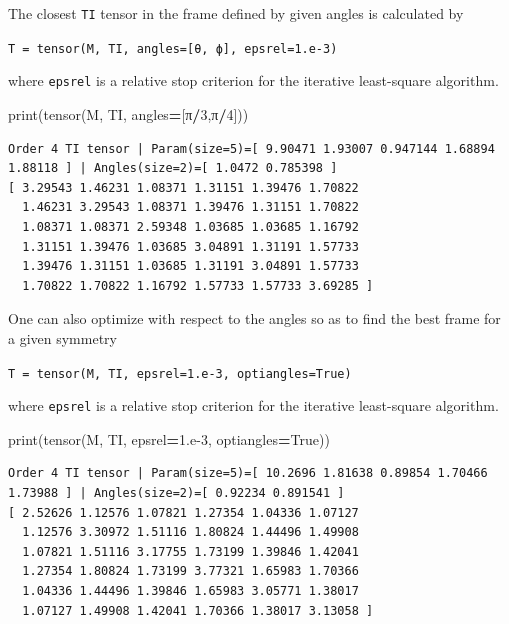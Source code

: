 \documentclass[
  a4paper,
  numbers=noendperiod,
  DIV=12]{scrreprt}
\newenvironment{Shaded}{\begin{snugshade}}{\end{snugshade}}
\newcommand{\BuiltInTok}[1]{#1}
\newcommand{\DecValTok}[1]{\textcolor[rgb]{0.00,0.00,0.81}{#1}}
\newcommand{\FloatTok}[1]{\textcolor[rgb]{0.00,0.00,0.81}{#1}}
\newcommand{\NormalTok}[1]{#1}
\newcommand{\OperatorTok}[1]{\textcolor[rgb]{0.81,0.36,0.00}{\textbf{#1}}}
\newcommand{\VariableTok}[1]{\textcolor[rgb]{0.00,0.00,0.00}{#1}}
\begin{document}
The closest \texttt{TI} tensor in the frame defined by given angles is
calculated by

\texttt{T\ =\ tensor(M,\ TI,\ angles={[}θ,\ ϕ{]},\ epsrel=1.e-3)}

where \texttt{epsrel} is a relative stop criterion for the iterative
least-square algorithm.

\begin{Shaded}
\begin{Highlighting}[]
\BuiltInTok{print}\NormalTok{(tensor(M, TI, angles}\OperatorTok{=}\NormalTok{[π}\OperatorTok{/}\DecValTok{3}\NormalTok{,π}\OperatorTok{/}\DecValTok{4}\NormalTok{]))}
\end{Highlighting}
\end{Shaded}

\begin{verbatim}
Order 4 TI tensor | Param(size=5)=[ 9.90471 1.93007 0.947144 1.68894 1.88118 ] | Angles(size=2)=[ 1.0472 0.785398 ]
[ 3.29543 1.46231 1.08371 1.31151 1.39476 1.70822 
  1.46231 3.29543 1.08371 1.39476 1.31151 1.70822 
  1.08371 1.08371 2.59348 1.03685 1.03685 1.16792 
  1.31151 1.39476 1.03685 3.04891 1.31191 1.57733 
  1.39476 1.31151 1.03685 1.31191 3.04891 1.57733 
  1.70822 1.70822 1.16792 1.57733 1.57733 3.69285 ]
\end{verbatim}

One can also optimize with respect to the angles so as to find the best
frame for a given symmetry

\texttt{T\ =\ tensor(M,\ TI,\ epsrel=1.e-3,\ optiangles=True)}

where \texttt{epsrel} is a relative stop criterion for the iterative
least-square algorithm.

\begin{Shaded}
\begin{Highlighting}[]
\BuiltInTok{print}\NormalTok{(tensor(M, TI, epsrel}\OperatorTok{=}\FloatTok{1.e{-}3}\NormalTok{, optiangles}\OperatorTok{=}\VariableTok{True}\NormalTok{))}
\end{Highlighting}
\end{Shaded}

\begin{verbatim}
Order 4 TI tensor | Param(size=5)=[ 10.2696 1.81638 0.89854 1.70466 1.73988 ] | Angles(size=2)=[ 0.92234 0.891541 ]
[ 2.52626 1.12576 1.07821 1.27354 1.04336 1.07127 
  1.12576 3.30972 1.51116 1.80824 1.44496 1.49908 
  1.07821 1.51116 3.17755 1.73199 1.39846 1.42041 
  1.27354 1.80824 1.73199 3.77321 1.65983 1.70366 
  1.04336 1.44496 1.39846 1.65983 3.05771 1.38017 
  1.07127 1.49908 1.42041 1.70366 1.38017 3.13058 ]
\end{verbatim}
\end{document}
